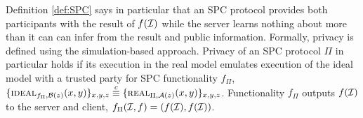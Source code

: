 \noindent
Definition \ref{def:SPC} says in particular that an \ac{SPC} protocol provides both participants with the result of $f(\mathcal{I})$ while the server learns nothing about \ClientSet more than it can can infer from the result and public information.
Formally, privacy is defined using the simulation-based approach.
Privacy of an \ac{SPC} protocol $\Pi$ in particular holds if its execution in the real model emulates execution of the ideal model with a trusted party for \ac{SPC} functionality $f_\Pi$, \ie
$ \{\IDEAL_{f_\Pi, \cB(z)}(x, y)\}_{x, y, z} \stackrel{c}{\equiv} \{\REAL_{\Pi, \cA(z)}(x, y)\}_{x, y, z}$.
Functionality $f_\Pi$ outputs $f(\mathcal{I})$ to the server and client, \ie $f_{\Pi}(\mathcal{I}, f)=(f(\mathcal{I}), f(\mathcal{I}))$.


